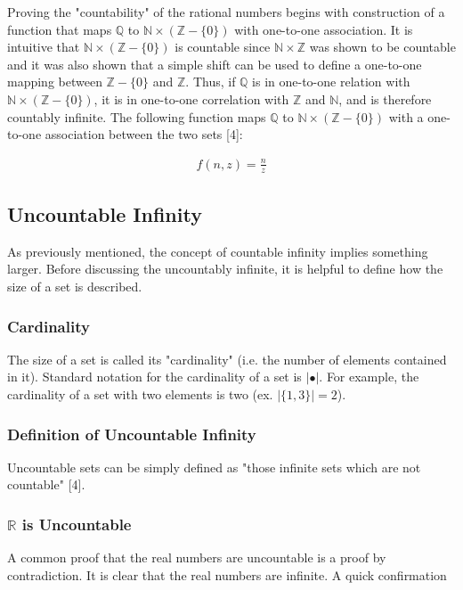 \documentclass{article}
\begin{document}
Proving the "countability" of the rational numbers begins with construction of a function that maps  $\mathbb{Q}$ to $\mathbb{N} \times (\mathbb{Z} - \{0\})$ with one-to-one association.  It is intuitive that $\mathbb{N} \times (\mathbb{Z} - \{0\})$ is countable since $\mathbb{N} \times \mathbb{Z}$ was shown to be countable and it was also shown that a simple shift can be used to define a one-to-one mapping between $\mathbb{Z} - \{0\}$ and $\mathbb{Z}$.  Thus, if $\mathbb{Q}$ is in one-to-one relation with $\mathbb{N} \times (\mathbb{Z} - \{0\})$, it is in one-to-one correlation with $\mathbb{Z}$ and $\mathbb{N}$, and is therefore countably infinite.  The following function maps $\mathbb{Q}$ to $\mathbb{N} \times (\mathbb{Z} - \{0\})$ with a one-to-one association between the two sets [4]:

\begin{gather*}
f(n, z) = \frac{n}{z}
\end{gather*}

\subsection{Uncountable Infinity}
As previously mentioned, the concept of countable infinity implies something larger.  Before discussing the uncountably infinite, it is helpful to define how the size of a set is described.

\subsubsection{Cardinality}
The size of a set is called its "cardinality" (i.e. the number of elements contained in it).  Standard notation for the cardinality of a set is $|\bullet|$.  For example, the cardinality of a set with two elements is two (ex. $|\{1, 3\}| = 2$).

\subsubsection{Definition of Uncountable Infinity}
Uncountable sets can be simply defined as "those infinite sets which are not countable" [4].

\subsubsection{$\mathbb{R}$ is Uncountable}
A common proof that the real numbers are uncountable is a proof by contradiction.  It is clear that the real numbers are infinite.  A quick confirmation
\end{document}
